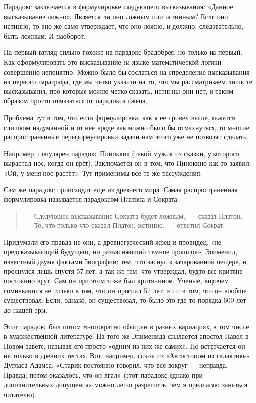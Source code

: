 Парадокс заключается в формулировке следующего высказывания: «Данное высказывание ложно». Является ли оно ложным или истинным? Если оно истинно, то оно же само утверждает, что оно ложно, и должно, следовательно, быть ложным. И нао\-бо\-рот.

На первый взгляд сильно похоже на парадокс брадобрея, но только на первый.  Как сформулировать это высказывание на языке математической логики — совершенно непонятно. Можно было бы сослаться на определение высказывания из первого параграфа, где мы четко указали на то, что мы рассматриваем лишь те высказывания, про которые можно четко сказать, истинны они нет, и таким образом просто отмазаться от парадокса лжеца.

Проблема тут в том, что если формулировка, как я ее привел выше, кажется слишком надуманной и от нее вроде как можно было бы отмахнуться, то многие распространенные переформулировки задачи нам этого уже не позволят сделать.

Например, популярен парадокс Пиноккио (такой мужик из сказки, у которого вырастал нос, когда он врёт). Заключается он в том, что Пиноккио как-то заявил: «Ой, у меня нос растёт». Тут применимы все те же рассуждения.

Сам же парадокс происходит еще из древнего мира. Самая распространенная формулировка называется парадоксом Платона и Сократа:

\begin{quote}
---~Следующее высказывание Сократа будет ложным,~--- сказал Платон.\\
---~То, что только что сказал Платон, истинно,~--- ответил Сократ.
\end{quote}

Придумали его правда не они, а древнегреческий жрец и провидец, «не предсказывающий будущего, но разъясняющий темное прошлое», Эпименид, известный двумя фактами биографии: тем, что заснул в зачарованной пещере, и проснулся лишь спустя 57 лет, а так же тем, что утверждал, будто все критяне постоянно врут. Сам он при этом тоже был критянином. Ученые, впрочем, сомневаются не только в том, что он проспал 57 лет, но и в том, что он вообще существовал. Если, однако, он существовал, то было это где-то порядка 600 лет до нашей эры.

Этот парадокс был потом многократно обыгран в разных вариациях, в том числе в художественной литературе. На того же Эпименида ссылается апостол Павел в Новом завете, называя его просто «одним из них же самих». Но встречается он не только в древних тестах. Вот, например, фраза из «Автостопом по галактике» Дугласа Адамса: «Старик постоянно говорил, что всё вокруг — неправда. Правда, потом оказалось, что он лгал» (этот парадокс однако при дополнительных допущениях можно легко разрешить, чем я предлагаю заняться читателю).

